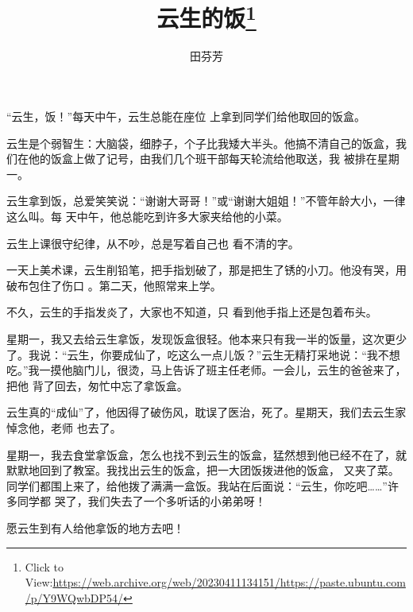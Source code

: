 \documentclass{article}
\title{云生的饭\footnote{Click to View:\url{https://web.archive.org/web/20230411134151/https://paste.ubuntu.com/p/Y9WQwbDP54/}}}
\author{田芬芳}
\date{}
\begin{document}

\maketitle


\Large

﻿“云生，饭！”每天中午，云生总能在座位
上拿到同学们给他取回的饭盒。 

云生是个弱智生：大脑袋，细脖子，个子比我矮大半头。他搞不清自己的饭盒，我们在他的饭盒上做了记号，由我们几个班干部每天轮流给他取送，我
被排在星期一。 

云生拿到饭，总爱笑笑说：“谢谢大哥哥！”或“谢谢大姐姐！”不管年龄大小，一律这么叫。每
天中午，他总能吃到许多大家夹给他的小菜。 

云生上课很守纪律，从不吵，总是写着自己也
看不清的字。 

\newpage

一天上美术课，云生削铅笔，把手指划破了，那是把生了锈的小刀。他没有哭，用破布包住了伤口
。第二天，他照常来上学。 

不久，云生的手指发炎了，大家也不知道，只
看到他手指上还是包着布头。 

星期一，我又去给云生拿饭，发现饭盒很轻。他本来只有我一半的饭量，这次更少了。我说：“云生，你要成仙了，吃这么一点儿饭？”云生无精打采地说：“我不想吃。”我一摸他脑门儿，很烫，马上告诉了班主任老师。一会儿，云生的爸爸来了，把他
背了回去，匆忙中忘了拿饭盒。 

云生真的“成仙”了，他因得了破伤风，耽误了医治，死了。星期天，我们去云生家悼念他，老师
也去了。 

星期一，我去食堂拿饭盒，怎么也找不到云生的饭盒，猛然想到他已经不在了，就默默地回到了教室。我找出云生的饭盒，把一大团饭拨进他的饭盒，
\newpage
又夹了菜。同学们都围上来了，给他拨了满满一盒饭。我站在后面说：“云生，你吃吧……”许多同学都
哭了，我们失去了一个多听话的小弟弟呀！ 

愿云生到有人给他拿饭的地方去吧！
\end{document}
